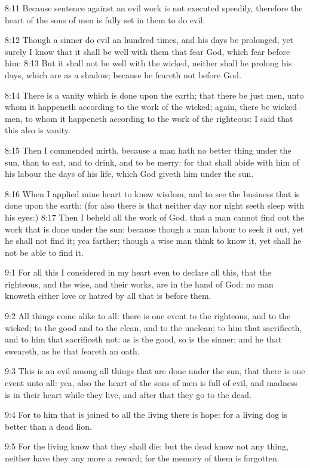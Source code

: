 8:11 Because sentence against an evil work is not executed speedily, therefore the heart of the sons of men is fully set in them to do evil.

8:12 Though a sinner do evil an hundred times, and his days be prolonged, yet surely I know that it shall be well with them that fear God, which fear before him: 8:13 But it shall not be well with the wicked, neither shall he prolong his days, which are as a shadow; because he feareth not before God.

8:14 There is a vanity which is done upon the earth; that there be just men, unto whom it happeneth according to the work of the wicked; again, there be wicked men, to whom it happeneth according to the work of the righteous: I said that this also is vanity.

8:15 Then I commended mirth, because a man hath no better thing under the sun, than to eat, and to drink, and to be merry: for that shall abide with him of his labour the days of his life, which God giveth him under the sun.

8:16 When I applied mine heart to know wisdom, and to see the business that is done upon the earth: (for also there is that neither day nor night seeth sleep with his eyes:) 8:17 Then I beheld all the work of God, that a man cannot find out the work that is done under the sun: because though a man labour to seek it out, yet he shall not find it; yea farther; though a wise man think to know it, yet shall he not be able to find it.

9:1 For all this I considered in my heart even to declare all this, that the righteous, and the wise, and their works, are in the hand of God: no man knoweth either love or hatred by all that is before them.

9:2 All things come alike to all: there is one event to the righteous, and to the wicked; to the good and to the clean, and to the unclean; to him that sacrificeth, and to him that sacrificeth not: as is the good, so is the sinner; and he that sweareth, as he that feareth an oath.

9:3 This is an evil among all things that are done under the sun, that there is one event unto all: yea, also the heart of the sons of men is full of evil, and madness is in their heart while they live, and after that they go to the dead.

9:4 For to him that is joined to all the living there is hope: for a living dog is better than a dead lion.

9:5 For the living know that they shall die: but the dead know not any thing, neither have they any more a reward; for the memory of them is forgotten.

